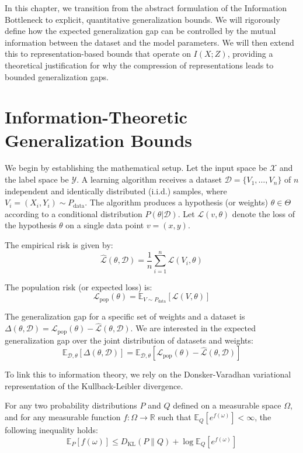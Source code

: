 In this chapter, we transition from the abstract formulation of the Information Bottleneck to explicit, quantitative generalization bounds. We will rigorously define how the expected generalization gap can be controlled by the mutual information between the dataset and the model parameters. We will then extend this to representation-based bounds that operate on $I(X; Z)$, providing a theoretical justification for why the compression of representations leads to bounded generalization gaps.

\section{Information-Theoretic Generalization Bounds}

We begin by establishing the mathematical setup. Let the input space be $\mathcal{X}$ and the label space be $\mathcal{Y}$. A learning algorithm receives a dataset $\mathcal{D} = \{V_1, \dots, V_n\}$ of $n$ independent and identically distributed (i.i.d.) samples, where $V_i = (X_i, Y_i) \sim P_{\text{data}}$. The algorithm produces a hypothesis (or weights) $\theta \in \Theta$ according to a conditional distribution $P(\theta | \mathcal{D})$. Let $\mathcal{L}(v, \theta)$ denote the loss of the hypothesis $\theta$ on a single data point $v = (x, y)$.

The empirical risk is given by:
\[ \hat{\mathcal{L}}(\theta, \mathcal{D}) = \frac{1}{n} \sum_{i=1}^n \mathcal{L}(V_i, \theta) \]

The population risk (or expected loss) is:
\[ \mathcal{L}_{\text{pop}}(\theta) = \mathbb{E}_{V \sim P_{\text{data}}} [\mathcal{L}(V, \theta)] \]

The generalization gap for a specific set of weights and a dataset is $\Delta(\theta, \mathcal{D}) = \mathcal{L}_{\text{pop}}(\theta) - \hat{\mathcal{L}}(\theta, \mathcal{D})$. We are interested in the expected generalization gap over the joint distribution of datasets and weights:
\[ \mathbb{E}_{\mathcal{D}, \theta}[\Delta(\theta, \mathcal{D})] = \mathbb{E}_{\mathcal{D}, \theta}[\mathcal{L}_{\text{pop}}(\theta) - \hat{\mathcal{L}}(\theta, \mathcal{D})] \]

To link this to information theory, we rely on the Donsker-Varadhan variational representation of the Kullback-Leibler divergence.

\begin{lemma} \label{lem:donsker}
For any two probability distributions $P$ and $Q$ defined on a measurable space $\Omega$, and for any measurable function $f: \Omega \to \mathbb{R}$ such that $\mathbb{E}_{Q}[e^{f(\omega)}] < \infty$, the following inequality holds:
\[ \mathbb{E}_{P}[f(\omega)] \leq D_{\text{KL}}(P \parallel Q) + \log \mathbb{E}_{Q}[e^{f(\omega)}] \]
\end{lemma}

